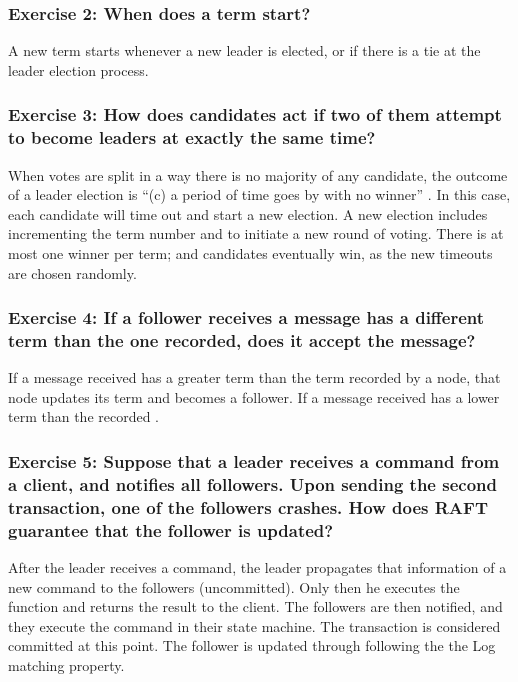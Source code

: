 \documentclass[12pt,a4paper]{article}
\begin{document}
\subsubsection*{Exercise 2: When does a term start? }
A new term starts whenever a new leader is elected, or if there is a tie at the leader election process.



\subsubsection*{Exercise 3: How does candidates act if two of them attempt to become leaders at exactly the same time?}

When votes are split in a way there is no majority of any candidate, the outcome of a leader election is ``(c) a period of time goes by with no winner'' \cite{raft_paper}. In this case, each candidate will time out and start a new election. A new election includes incrementing the term number and to initiate a new round of voting. There is at most one winner per term; and candidates eventually win, as the new timeouts are chosen randomly.


\subsubsection*{Exercise 4: If a follower receives a message has a different term than the one recorded, does it accept the message? }

If a message received has a greater term than the term recorded by a node, that node updates its term and becomes a follower. If a message received has a lower term than the recorded .


\subsubsection*{Exercise 5: Suppose that a leader receives a command from a client, and notifies all followers. Upon sending the second transaction, one of the followers crashes. How does RAFT guarantee that the follower is updated?}


After the leader receives a command, the leader propagates that information of a new command to the followers (uncommitted). Only then he executes the function and returns the result to the client. The followers are then notified, and they execute the command in their state machine. The transaction is considered committed at this point. The follower is updated  through following the the Log matching property.
\end{document}
